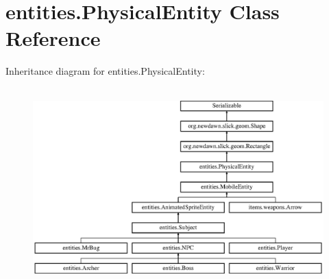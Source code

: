 \hypertarget{classentities_1_1_physical_entity}{}\section{entities.\+Physical\+Entity Class Reference}
\label{classentities_1_1_physical_entity}
Inheritance diagram for entities.\+Physical\+Entity\+:\begin{figure}[H]
\begin{center}
\leavevmode
\includegraphics[height=7.671233cm]{classentities_1_1_physical_entity}
\end{center}
\end{figure}
